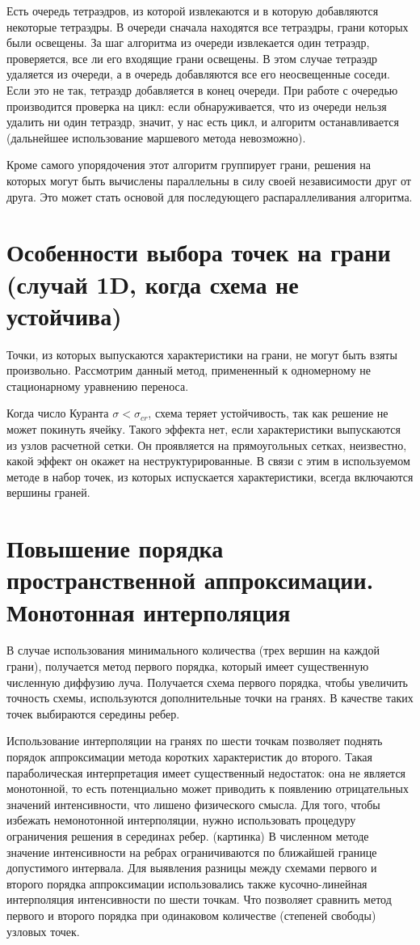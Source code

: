 Есть очередь тетраэдров, из которой извлекаются и в которую добавляются некоторые тетраэдры. В очереди сначала находятся все тетраэдры, грани которых были освещены. За шаг алгоритма из очереди извлекается один тетраэдр, проверяется, все ли его входящие грани освещены. В этом случае тетраэдр удаляется из очереди, а в очередь добавляются все его неосвещенные соседи. Если это не так, тетраэдр добавляется в конец очереди. При работе с очередью производится проверка на цикл: если обнаруживается, что из очереди нельзя удалить ни один тетраэдр, значит, у нас есть цикл, и алгоритм останавливается (дальнейшее использование маршевого метода невозможно).

Кроме самого упорядочения этот алгоритм группирует грани, решения на которых могут быть вычислены параллельны в силу своей независимости друг от друга. Это может стать основой для последующего распараллеливания алгоритма.
\section{Особенности выбора точек на грани (случай 1D, когда схема не устойчива)}
Точки, из которых выпускаются характеристики на грани, не могут быть взяты произвольно. Рассмотрим данный метод, примененный к одномерному не стационарному уравнению переноса.

Когда число Куранта $\sigma < \sigma_{cr}$, схема теряет устойчивость, так как решение не может покинуть ячейку. Такого эффекта нет, если характеристики выпускаются из узлов расчетной сетки. Он проявляется на прямоугольных сетках, неизвестно, какой эффект он окажет на неструктурированные. В связи с этим в используемом методе в набор точек, из которых испускается характеристики, всегда включаются вершины граней. 
\section{Повышение порядка пространственной аппроксимации. Монотонная интерполяция}
В случае использования минимального количества (трех вершин на каждой грани), получается метод первого порядка, который имеет существенную численную диффузию луча. Получается схема первого порядка, чтобы увеличить точность схемы, используются дополнительные точки на гранях. В качестве таких точек выбираются середины ребер. 

Использование интерполяции на гранях по шести точкам позволяет поднять порядок аппроксимации метода коротких характеристик до второго. Такая параболическая интерпретация имеет существенный недостаток: она не является монотонной, то есть потенциально может приводить к появлению отрицательных значений интенсивности, что лишено физического смысла. Для того, чтобы избежать немонотонной интерполяции, нужно использовать процедуру ограничения решения в серединах ребер.
(картинка)
В численном методе значение интенсивности на ребрах ограничиваются по ближайшей границе допустимого интервала. Для выявления разницы между схемами первого и второго порядка аппроксимации использовались также кусочно-линейная интерполяция интенсивности по шести точкам. Что позволяет сравнить метод первого и второго порядка при одинаковом количестве (степеней свободы) узловых точек. 

